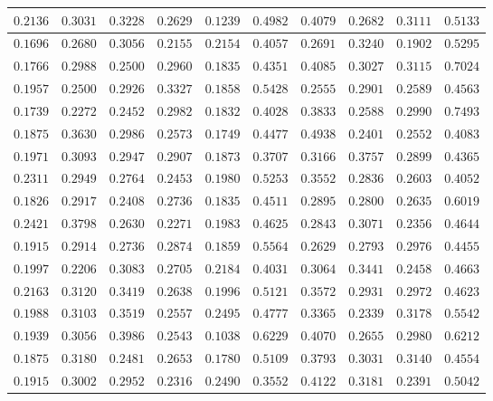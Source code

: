\begin{longtable}{c|c|c|c|c|c|c|c|c|c}
$0.2136$ & $0.3031$ & $0.3228$ & $0.2629$ & $0.1239$ & $0.4982$ & $0.4079$ & $0.2682$ & $0.3111$ & $0.5133$ \\ \hline
$0.1696$ & $0.2680$ & $0.3056$ & $0.2155$ & $0.2154$ & $0.4057$ & $0.2691$ & $0.3240$ & $0.1902$ & $0.5295$ \\ \hline
$0.1766$ & $0.2988$ & $0.2500$ & $0.2960$ & $0.1835$ & $0.4351$ & $0.4085$ & $0.3027$ & $0.3115$ & $0.7024$ \\ \hline
$0.1957$ & $0.2500$ & $0.2926$ & $0.3327$ & $0.1858$ & $0.5428$ & $0.2555$ & $0.2901$ & $0.2589$ & $0.4563$ \\ \hline
$0.1739$ & $0.2272$ & $0.2452$ & $0.2982$ & $0.1832$ & $0.4028$ & $0.3833$ & $0.2588$ & $0.2990$ & $0.7493$ \\ \hline
$0.1875$ & $0.3630$ & $0.2986$ & $0.2573$ & $0.1749$ & $0.4477$ & $0.4938$ & $0.2401$ & $0.2552$ & $0.4083$ \\ \hline
$0.1971$ & $0.3093$ & $0.2947$ & $0.2907$ & $0.1873$ & $0.3707$ & $0.3166$ & $0.3757$ & $0.2899$ & $0.4365$ \\ \hline
$0.2311$ & $0.2949$ & $0.2764$ & $0.2453$ & $0.1980$ & $0.5253$ & $0.3552$ & $0.2836$ & $0.2603$ & $0.4052$ \\ \hline
$0.1826$ & $0.2917$ & $0.2408$ & $0.2736$ & $0.1835$ & $0.4511$ & $0.2895$ & $0.2800$ & $0.2635$ & $0.6019$ \\ \hline
$0.2421$ & $0.3798$ & $0.2630$ & $0.2271$ & $0.1983$ & $0.4625$ & $0.2843$ & $0.3071$ & $0.2356$ & $0.4644$ \\ \hline
$0.1915$ & $0.2914$ & $0.2736$ & $0.2874$ & $0.1859$ & $0.5564$ & $0.2629$ & $0.2793$ & $0.2976$ & $0.4455$ \\ \hline
$0.1997$ & $0.2206$ & $0.3083$ & $0.2705$ & $0.2184$ & $0.4031$ & $0.3064$ & $0.3441$ & $0.2458$ & $0.4663$ \\ \hline
$0.2163$ & $0.3120$ & $0.3419$ & $0.2638$ & $0.1996$ & $0.5121$ & $0.3572$ & $0.2931$ & $0.2972$ & $0.4623$ \\ \hline
$0.1988$ & $0.3103$ & $0.3519$ & $0.2557$ & $0.2495$ & $0.4777$ & $0.3365$ & $0.2339$ & $0.3178$ & $0.5542$ \\ \hline
$0.1939$ & $0.3056$ & $0.3986$ & $0.2543$ & $0.1038$ & $0.6229$ & $0.4070$ & $0.2655$ & $0.2980$ & $0.6212$ \\ \hline
$0.1875$ & $0.3180$ & $0.2481$ & $0.2653$ & $0.1780$ & $0.5109$ & $0.3793$ & $0.3031$ & $0.3140$ & $0.4554$ \\ \hline
$0.1915$ & $0.3002$ & $0.2952$ & $0.2316$ & $0.2490$ & $0.3552$ & $0.4122$ & $0.3181$ & $0.2391$ & $0.5042$ \\ \hline

\end{longtable}
